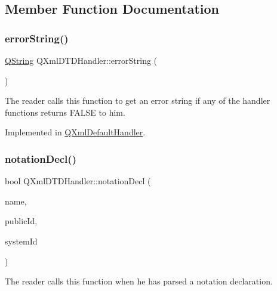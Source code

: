 \subsection{Member Function Documentation}
\mbox{\label{class_q_xml_d_t_d_handler_a40f40b9674be96a009a93147d5e0178d}} 
\subsubsection{\texorpdfstring{errorString()}{errorString()}}
{\footnotesize\ttfamily \mbox{\hyperlink{class_q_string}{Q\+String}} Q\+Xml\+D\+T\+D\+Handler\+::error\+String (\begin{DoxyParamCaption}{ }\end{DoxyParamCaption})\hspace{0.3cm}{\ttfamily [pure virtual]}}

The reader calls this function to get an error string if any of the handler functions returns F\+A\+L\+SE to him. 

Implemented in \mbox{\hyperlink{class_q_xml_default_handler_afcbe5fdce86cea4b7863e752c2413c45}{Q\+Xml\+Default\+Handler}}.

\mbox{\label{class_q_xml_d_t_d_handler_a3ce7216b7646cd26bd11c4bdee883507}} 
\subsubsection{\texorpdfstring{notationDecl()}{notationDecl()}}
{\footnotesize\ttfamily bool Q\+Xml\+D\+T\+D\+Handler\+::notation\+Decl (\begin{DoxyParamCaption}\item[{const \mbox{\hyperlink{class_q_string}{Q\+String}} \&}]{name,  }\item[{const \mbox{\hyperlink{class_q_string}{Q\+String}} \&}]{public\+Id,  }\item[{const \mbox{\hyperlink{class_q_string}{Q\+String}} \&}]{system\+Id }\end{DoxyParamCaption})\hspace{0.3cm}{\ttfamily [pure virtual]}}

The reader calls this function when he has parsed a notation declaration.


